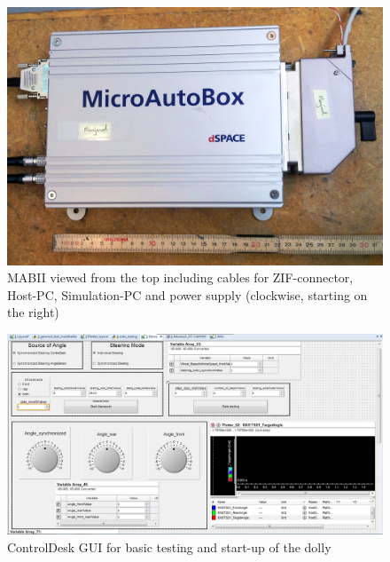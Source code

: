 \documentclass[ExampleMasters.tex]{subfiles}
\begin{document}
\begin{figure}[h]
	\centering
	\includegraphics[width=1\linewidth]{figures/MABII_topview_cropped}
	\caption{\acrlong{MABII} viewed from the top including cables for \acrshort{ZIF}-connector, Host-PC, Simulation-PC and power supply (clockwise, starting on the right)}
	\label{fig:microautobox_topview}
\end{figure}


\begin{figure}[h]
	\centering
	\includegraphics[width=1\linewidth]{figures/CD_Layout}
	\caption{ControlDesk \acrshort{GUI} for basic testing and start-up of the dolly}	
	\label{fig:control_desk_GUI}
\end{figure}
\end{document}
